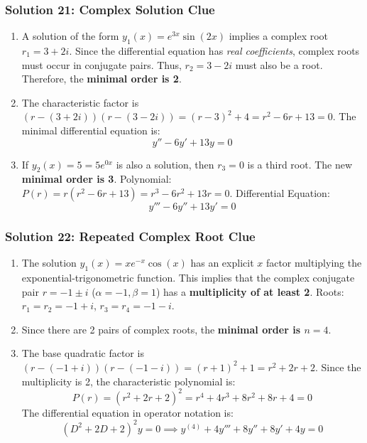 \documentclass[11pt,letterpaper]{article}
\begin{document}
\subsubsection*{Solution 21: Complex Solution Clue}
\begin{enumerate}[label=(\alph*)]
    \item A solution of the form $y_1(x) = e^{3x}\sin(2x)$ implies a complex root $r_1 = 3 + 2i$. Since the differential equation has \textit{real coefficients}, complex roots must occur in conjugate pairs. Thus, $r_2 = 3 - 2i$ must also be a root.
    Therefore, the \textbf{minimal order is 2}.
    \item The characteristic factor is $(r - (3+2i))(r - (3-2i)) = (r-3)^2 + 4 = r^2 - 6r + 13 = 0$.
    The minimal differential equation is:
    \[ y'' - 6y' + 13y = 0 \]
    \item If $y_2(x) = 5 = 5e^{0x}$ is also a solution, then $r_3 = 0$ is a third root.
    The new \textbf{minimal order is 3}.
    Polynomial: $P(r) = r(r^2 - 6r + 13) = r^3 - 6r^2 + 13r = 0$.
    Differential Equation:
    \[ y''' - 6y'' + 13y' = 0 \]
\end{enumerate}

\subsubsection*{Solution 22: Repeated Complex Root Clue}
\begin{enumerate}[label=(\alph*)]
    \item The solution $y_1(x) = x e^{-x} \cos(x)$ has an explicit $x$ factor multiplying the exponential-trigonometric function. This implies that the complex conjugate pair $r = -1 \pm i$ ($\alpha = -1, \beta = 1$) has a \textbf{multiplicity of at least 2}.
    Roots: $r_1 = r_2 = -1 + i$, $r_3 = r_4 = -1 - i$.
    \item Since there are 2 pairs of complex roots, the \textbf{minimal order is $n = 4$}.
    \item The base quadratic factor is $(r - (-1+i))(r - (-1-i)) = (r+1)^2 + 1 = r^2 + 2r + 2$.
    Since the multiplicity is 2, the characteristic polynomial is:
    \[ P(r) = (r^2 + 2r + 2)^2 = r^4 + 4r^3 + 8r^2 + 8r + 4 = 0 \]
    The differential equation in operator notation is:
    \[ (D^2 + 2D + 2)^2 y = 0 \implies y^{(4)} + 4y''' + 8y'' + 8y' + 4y = 0 \]
\end{enumerate}
\end{document}
